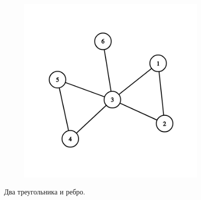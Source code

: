 \begin{solution}
\begin{figure}[H]
\begin{subfigure}[a]{0.24\linewidth}
  \end{subfigure}
  \begin{subfigure}[a]{0.24\linewidth}
    \includegraphics[width=\linewidth]{_img/344/03.png}
  \end{subfigure}
  \caption{Два треугольника и ребро.}
\end{figure}


\end{solution}
